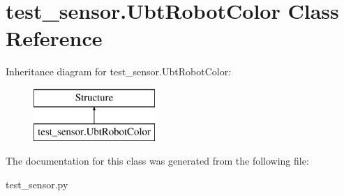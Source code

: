 \hypertarget{classtest__sensor_1_1UbtRobotColor}{\section{test\+\_\+sensor.\+Ubt\+Robot\+Color Class Reference}
\label{classtest__sensor_1_1UbtRobotColor}
}
Inheritance diagram for test\+\_\+sensor.\+Ubt\+Robot\+Color\+:\begin{figure}[H]
\begin{center}
\leavevmode
\includegraphics[height=2.000000cm]{classtest__sensor_1_1UbtRobotColor}
\end{center}
\end{figure}


The documentation for this class was generated from the following file\+:\begin{DoxyCompactItemize}
\item 
test\+\_\+sensor.\+py\end{DoxyCompactItemize}
